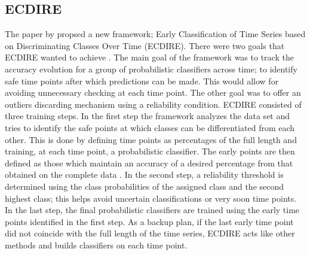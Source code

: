 \subsection{ECDIRE}
\label{SubsectionECDIRE}
The paper by \cite{mori2017reliable} propsed a new framework; Early Classification of Time Series based on Discriminating Classes Over Time (ECDIRE).
There were two goals that ECDIRE wanted to achieve \cite{mori2017early}.
The main goal of the framework was to track the accuracy evolution for a group of probabilistic classifiers across time; to identify safe time points after which
predictions can be made. This would allow for avoiding unnecessary checking at each time point. The other goal was to offer an outliers discarding mechanism using a reliability condition.
ECDIRE consisted of three training steps. In the first step the framework analyzes the data set and tries to identify the safe points at which classes can be differentiated from each other.
This is done by defining time points as percentages of the full length and training, at each time point, a probabilistic classifier.
The early points are then defined as those which maintain an accuracy of a desired percentage from that obtained on the complete data \cite{santos2016literature}.
In the second step, a reliability threshold is determined using the class probabilities of the assigned class and the second highest class;
this helps avoid uncertain classifications or very soon time points. In the last step, the final probabilistic classifiers are trained using the early time points
identified in the first step. As a backup plan, if the last early time point did not coincide with the full length of the time series, ECDIRE acts like other methods and
builds classifiers on each time point.

